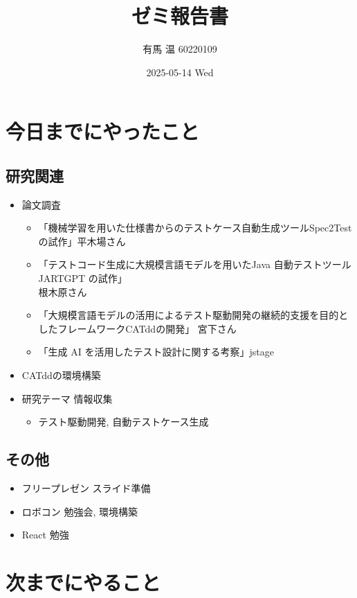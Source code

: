 \documentclass[uplatex, onecolumn, 10pt]{jsarticle}
\begin{document}
\title{\vspace{-40mm}\bf{\LARGE{ゼミ報告書}}}
\author{\vspace{-40mm}有馬 温 60220109}
\date{2025-05-14 Wed}
\maketitle


\section{今日までにやったこと}

\subsection*{研究関連} 
\begin{itemize}
	\item 論文調査
		\begin{itemize}
			\item 「機械学習を用いた仕様書からのテストケース自動生成ツールSpec2Testの試作」平木場さん
			\item 「テストコード生成に大規模言語モデルを用いたJava 自動テストツール JARTGPT の試作」\\ 根木原さん
			\item 「大規模言語モデルの活用によるテスト駆動開発の継続的支援を目的としたフレームワークCATddの開発」 宮下さん
			\item 「生成 AI を活用したテスト設計に関する考察」jstage
		\end{itemize}
	\item CATddの環境構築
	\item 研究テーマ 情報収集
		\begin{itemize}
			\item テスト駆動開発, 自動テストケース生成
		\end{itemize}
\end{itemize}

\subsection*{その他}
\begin{itemize}
	\item フリープレゼン スライド準備
	\item ロボコン 勉強会, 環境構築
	\item React 勉強
\end{itemize}


\section{次までにやること}
\end{document}
